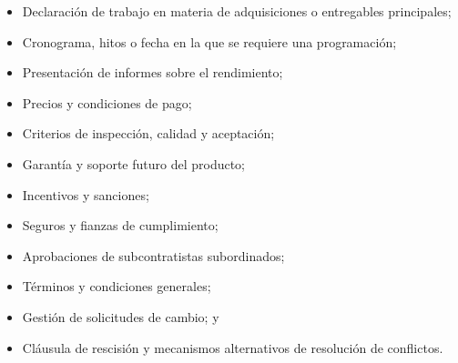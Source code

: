 \documentclass[letterpaper,12pt,openright,oneside]{article}
\theoremstyle{plain}
\begin{document}
\begin{itemize}
    \item Declaración de trabajo en materia de adquisiciones o entregables principales;
    \item Cronograma, hitos o fecha en la que se requiere una programación;
    \item Presentación de informes sobre el rendimiento;
    \item Precios y condiciones de pago;
    \item Criterios de inspección, calidad y aceptación;
    \item Garantía y soporte futuro del producto;
    \item Incentivos y sanciones;
    \item Seguros y fianzas de cumplimiento;
    \item Aprobaciones de subcontratistas subordinados;
    \item Términos y condiciones generales;
    \item Gestión de solicitudes de cambio; y
    \item Cláusula de rescisión y mecanismos alternativos de resolución de conflictos.
\end{itemize}
\end{document}
